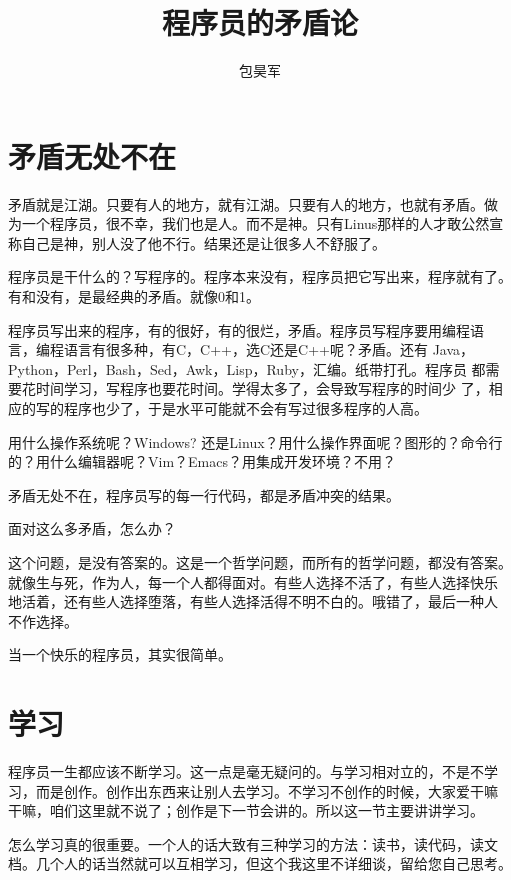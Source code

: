 \documentclass[10pt]{article}
\begin{document}
\begin{CJK*}{UTF8}{simsun}
\CJKtilde

\title{程序员的矛盾论}
\date{}
\author{包昊军}
\maketitle

\section{矛盾无处不在}

矛盾就是江湖。只要有人的地方，就有江湖。只要有人的地方，也就有矛盾。做
为一个程序员，很不幸，我们也是人。而不是神。只有Linus那样的人才敢公然宣
称自己是神，别人没了他不行。结果还是让很多人不舒服了。

程序员是干什么的？写程序的。程序本来没有，程序员把它写出来，程序就有了。
有和没有，是最经典的矛盾。就像0和1。

程序员写出来的程序，有的很好，有的很烂，矛盾。程序员写程序要用编程语
言，编程语言有很多种，有C，C++，选C还是C++呢？矛盾。还有
Java，Python，Perl，Bash，Sed，Awk，Lisp，Ruby，汇编。纸带打孔。程序员
都需要花时间学习，写程序也要花时间。学得太多了，会导致写程序的时间少
了，相应的写的程序也少了，于是水平可能就不会有写过很多程序的人高。

用什么操作系统呢？Windows? 还是Linux？用什么操作界面呢？图形的？命令行
的？用什么编辑器呢？Vim？Emacs？用集成开发环境？不用？

矛盾无处不在，程序员写的每一行代码，都是矛盾冲突的结果。

面对这么多矛盾，怎么办？

这个问题，是没有答案的。这是一个哲学问题，而所有的哲学问题，都没有答案。
就像生与死，作为人，每一个人都得面对。有些人选择不活了，有些人选择快乐
地活着，还有些人选择堕落，有些人选择活得不明不白的。哦错了，最后一种人
不作选择。

当一个快乐的程序员，其实很简单。

\section{学习}

程序员一生都应该不断学习。这一点是毫无疑问的。与学习相对立的，不是不学
习，而是创作。创作出东西来让别人去学习。不学习不创作的时候，大家爱干嘛
干嘛，咱们这里就不说了；创作是下一节会讲的。所以这一节主要讲讲学习。

怎么学习真的很重要。一个人的话大致有三种学习的方法：读书，读代码，读文
档。几个人的话当然就可以互相学习，但这个我这里不详细谈，留给您自己思考。


\end{CJK*}
\end{document}
